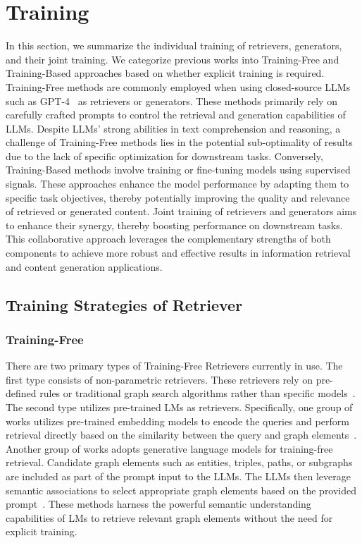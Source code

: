\documentclass[acmsmall]{acmart}
\begin{document}
\section{Training}
\label{sec:training}
In this section, we summarize the individual training of retrievers, generators, and their joint training. We categorize previous works into Training-Free and Training-Based approaches based on whether explicit training is required. Training-Free methods are commonly employed when using closed-source LLMs such as GPT-4~\cite{ref:gpt4} as retrievers or generators. These methods primarily rely on carefully crafted prompts to control the retrieval and generation capabilities of LLMs. Despite LLMs' strong abilities in text comprehension and reasoning, a challenge of Training-Free methods lies in the potential sub-optimality of results due to the lack of specific optimization for downstream tasks. Conversely, Training-Based methods involve training or fine-tuning models using supervised signals. These approaches enhance the model performance by adapting them to specific task objectives, thereby potentially improving the quality and relevance of retrieved or generated content. Joint training of retrievers and generators aims to enhance their synergy, thereby boosting performance on downstream tasks. This collaborative approach leverages the complementary strengths of both components to achieve more robust and effective results in information retrieval and content generation applications.

\subsection{Training Strategies of Retriever}
\subsubsection{Training-Free}
There are two primary types of Training-Free Retrievers currently in use. The first type consists of non-parametric retrievers. These retrievers rely on pre-defined rules or traditional graph search algorithms rather than specific models~\cite{ref:qa-gnn,ref:grapeqa}. The second type utilizes pre-trained LMs as retrievers. Specifically,  one group of works utilizes pre-trained embedding models to encode the queries and perform retrieval directly based on the similarity between the query and graph elements~\cite{ref:noname2}. Another group of works adopts generative language models for training-free retrieval. Candidate graph elements such as entities, triples, paths, or subgraphs are included as part of the prompt input to the LLMs. The LLMs then leverage semantic associations to select appropriate graph elements based on the provided prompt~\cite{ref:graphrag,ref:tog,ref:rok,ref:graphcot,ref:kg-gpt,ref:keqing,ref:gnn-rag}. These methods harness the powerful semantic understanding capabilities of LMs to retrieve relevant graph elements without the need for explicit training. 
\end{document}
